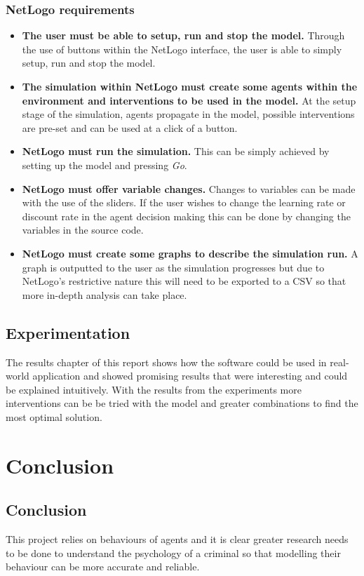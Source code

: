 \documentclass[11pt]{informatics-report}
\begin{document}
\subsection{NetLogo requirements}
\begin{itemize}
	\item \textbf{The user must be able to setup, run and stop the model.} Through the use of buttons within the NetLogo interface, the user is able to simply setup, run and stop the model.
	\item \textbf{The simulation within NetLogo must create some agents within the environment and interventions to be used in the model.} At the setup stage of the simulation, agents propagate in the model, possible interventions are pre-set and can be used at a click of a button.
	\item \textbf{NetLogo must run the simulation.} This can be simply achieved by setting up the model and pressing \textit{Go}.
	\item \textbf{NetLogo must offer variable changes.} Changes to variables can be made with the use of the sliders. If the user wishes to change the learning rate or discount rate in the agent decision making this can be done by changing the variables in the source code.
	\item \textbf{NetLogo must create some graphs to describe the simulation run.} A graph is outputted to the user as the simulation progresses but due to NetLogo's restrictive nature this will need to be exported to a CSV so that more in-depth analysis can take place.
\end{itemize}

\section{Experimentation}
The results chapter of this report shows how the software could be used in real-world application and showed promising results that were interesting and could be explained intuitively. With the results from the experiments more interventions can be be tried with the model and greater combinations to find the most optimal solution.

\chapter{Conclusion}

\section{Conclusion}
This project relies on behaviours of agents and it is clear greater research needs to be done to understand the psychology of a criminal so that modelling their behaviour can be more accurate and reliable. \par
\end{document}
